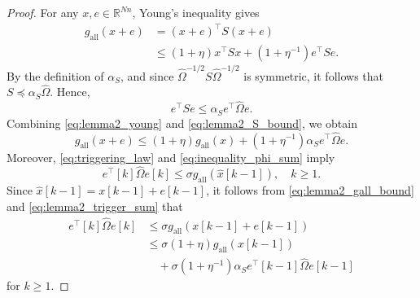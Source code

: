 \documentclass[letterpaper,10pt,conference]{ieeeconf}
\begin{document}
\begin{proof}
  For any $x,e \in \mathbb{R}^{Nn}$, Young's inequality gives
  \begin{align}
    g_{\mathrm{all}}(x+e)
    &= (x+e)^\top S (x+e) \\
    &\leq (1+\eta)x^\top Sx + \left(1+\eta^{-1}\right)e^\top Se.
    \label{eq:lemma2_young}
  \end{align}
  By the definition of $\alpha_S$, and since $\hat{\Omega}^{-1/2} S \hat{\Omega}^{-1/2}$ is symmetric, it follows that $S \preceq \alpha_S \hat{\Omega}$.
  Hence,
  \begin{equation}
    e^\top Se \leq \alpha_S e^\top \hat{\Omega}e.
    \label{eq:lemma2_S_bound}
  \end{equation}
  Combining \eqref{eq:lemma2_young} and \eqref{eq:lemma2_S_bound}, we obtain
  \begin{equation}
    g_{\mathrm{all}}(x+e)
    \leq (1+\eta)g_{\mathrm{all}}(x)
    + \left(1+\eta^{-1}\right)\alpha_S e^\top \hat{\Omega}e.
    \label{eq:lemma2_gall_bound}
  \end{equation}
  Moreover, \eqref{eq:triggering_law} and \eqref{eq:inequality_phi_sum} imply
  \begin{equation} \label{eq:lemma2_trigger_sum}
    e^\top[k] \hat\Omega e[k] \leq \sigma g_{\mathrm{all}}(\hat{x}[k-1]),\quad k\geq 1.
  \end{equation}
  Since $\hat{x}[k-1] = x[k-1] + e[k-1]$, it follows from \eqref{eq:lemma2_gall_bound} and \eqref{eq:lemma2_trigger_sum} that
  \begin{align}
    e^\top[k] \hat{\Omega} e[k]
    &\leq \sigma g_{\mathrm{all}}(x[k-1] + e[k-1]) \\
    &\leq \sigma(1+\eta) g_{\mathrm{all}}(x[k-1]) \\
    &\quad + \sigma \left(1+\eta^{-1}\right)\alpha_S
    e^\top[k-1] \hat{\Omega} e[k-1]
    \label{eq:lemma2_recursion}
  \end{align}
  for $k \geq 1$.


\end{proof}
\end{document}
